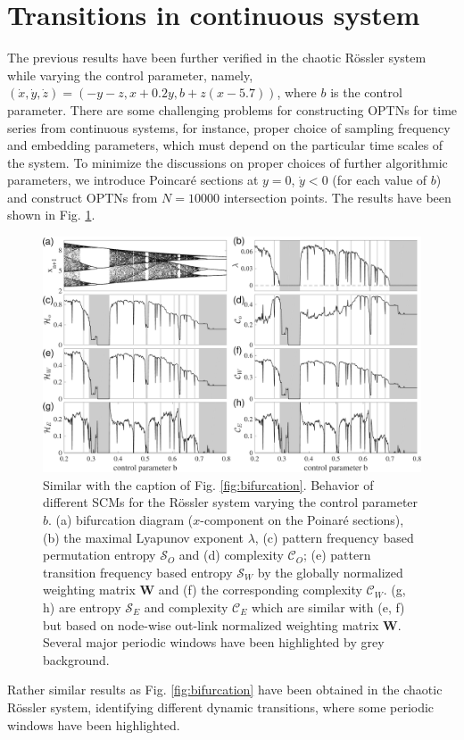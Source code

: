 \documentclass[12pt,aip,cha,reprint,nofootinbib]{revtex4-1}
\begin{document}
\section{Transitions in continuous system}
The previous results have been further verified in the chaotic R\"ossler system \cite{Roessler1976} while varying the control parameter, namely, $(\dot{x}, \dot{y}, \dot{z}) = (-y-z, x+0.2y, b+z(x-5.7))$, where $b$ is the control parameter. There are some challenging problems for constructing OPTNs for time series from continuous systems, for instance, proper choice of sampling frequency and embedding parameters, which must depend on the particular time scales of the system. To minimize the discussions on proper choices of further algorithmic parameters, we introduce Poincar\'e sections at $y=0$, $\dot{y}<0$ (for each value of $b$) and construct OPTNs from $N = 10000$ intersection points. The results have been shown in Fig. \ref{fig:bifurRossler}. 
\begin{figure}
	\centering 
	\includegraphics[width=2\columnwidth]{rosslerEntropy.pdf}
\caption{\small{Similar with the caption of Fig. \ref{fig:bifurcation}. Behavior of different SCMs for the R\"ossler system varying the control parameter $b$. (a) bifurcation diagram ($x$-component on the Poinar\'e sections), (b) the maximal Lyapunov exponent $\lambda$, (c) pattern frequency based permutation entropy $\mathcal{S}_O$ and (d) complexity $\mathcal{C}_O$; (e) pattern transition frequency based entropy $\mathcal{S}_W$ by the globally normalized weighting matrix $\mathbf{W}$ and (f) the corresponding complexity $\mathcal{C}_W$. (g, h) are entropy $\mathcal{S}_E$ and complexity $\mathcal{C}_E$ which are similar with (e, f) but based on node-wise out-link normalized weighting matrix $\mathbf{W}$. Several major periodic windows have been highlighted by grey background. } \label{fig:bifurRossler}}
\end{figure}
Rather similar results as Fig. \ref{fig:bifurcation} have been obtained in the chaotic R\"ossler system, identifying different dynamic transitions, where some periodic windows have been highlighted. 
\end{document}
